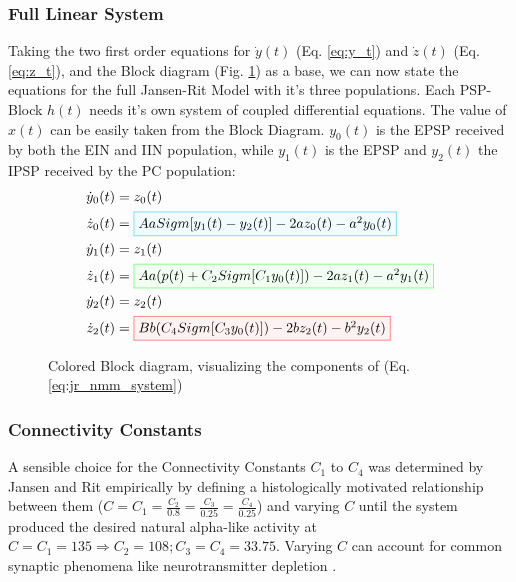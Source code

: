 
\subsubsection{Full Linear System}

Taking the two first order equations for $\dot{y}(t)$ (Eq. \ref{eq:y_t}) and $\dot{z}(t)$ (Eq. \ref{eq:z_t}), and the Block diagram (Fig. \ref{fig:JRBlockColored}) as a base, we can now state the equations for the full Jansen-Rit Model with it's three populations. Each PSP-Block $h(t)$ needs it's own system of coupled differential equations. The value of $x(t)$ can be easily taken from the Block Diagram. $y_0(t)$ is the EPSP received by both the EIN and IIN population, while $y_1(t)$ is the EPSP and $y_2(t)$ the IPSP received by the PC population:
\begin{equation}
    \begin{aligned}
        \dot{y}_0(t) &= z_0(t) \\
        \dot{z}_0(t) &= \fcolorbox{cyan!80}{cyan!5}{$ Aa Sigm[y_1(t) - y_2(t)] - 2az_0(t) - a^2y_0(t) $}\\
        \dot{y}_1(t) &= z_1(t) \\
        \dot{z}_1(t) &= \fcolorbox{green!80}{green!5}{$ Aa(p(t) + C_2Sigm[C_1y_0(t)]) - 2az_1(t) - a^2y_1(t)$}\\
        \dot{y}_2(t) &= z_2(t) \\
        \dot{z}_2(t) &= \fcolorbox{red!80}{red!5}{$ Bb(C_4Sigm[C_3y_0(t)]) - 2bz_2(t) -b^2y_2(t)$} \\
    \end{aligned}\label{eq:jr_nmm_system}
\end{equation}

\begin{figure}[H]
    \centering
    
    \caption{Colored Block diagram, visualizing the components of (Eq. \ref{eq:jr_nmm_system})}
    \label{fig:JRBlockColored}
\end{figure}

\subsubsection{Connectivity Constants}

A sensible choice for the Connectivity Constants $C_1$ to $C_4$ was determined by Jansen and Rit empirically by
defining a histologically motivated relationship between them ($C = C_1 = \frac{C_2}{0.8} = \frac{C_3}{0.25} =
\frac{C_4}{0.25}$) and varying $C$ until the system produced the desired natural alpha-like activity at $C=C_1=135
\Rightarrow C_2=108; C_3=C_4=33.75$.
Varying $C$ can account for common synaptic phenomena like neurotransmitter depletion \parencite{jansen_electroencephalogram_1995}.

